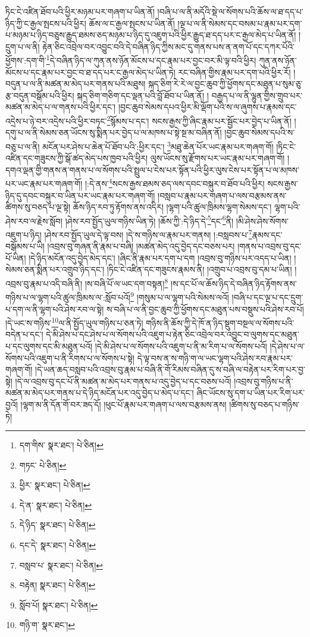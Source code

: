 ཏིང་ངེ་འཛིན་ཐོབ་པའི་ཕྱིར་མཉམ་པར་གཞག་པ་ཡིན་ནོ། །བཞི་པ་ལ་ནི་མདོའི་སྡེ་ལ་སོགས་པའི་ཆོས་ལ་ཐ་དད་པ་ཉིད་ཀྱི་ང་རྒྱལ་སྤངས་པའི་ཕྱིར། ཆོས་ལ་ང་རྒྱལ་སྤངས་པ་ཡིན་ནོ། །ལྔ་པ་ལ་ནི་སེམས་དང་བསམ་པ་རྣམ་པར་དག་པ་མཉམ་པ་ཉིད་བཅུས་རྒྱུད་ཐམས་ཅད་མཉམ་པ་ཉིད་དུ་འཇུག་པའི་ཕྱིར་རྒྱུད་ཐ་དད་པར་ང་རྒྱལ་མེད་པ་ཡིན་ནོ། །དྲུག་པ་ལ་ནི། རྟེན་ཅིང་འབྲེལ་བར་འབྱུང་བའི་དེ་བཞིན་ཉིད་ཀྱིས་མང་དུ་གནས་པས་ན་ནག་པོ་དང་དཀར་པོའི་ཕྱོགས་:དག་གི་\footnote{དག་གིས་  སྣར་ཐང་།  པེ་ཅིན། }དེ་བཞིན་ཉིད་ལ་ཀུན་ནས་ཉོན་མོངས་པ་དང་རྣམ་པར་བྱང་བར་མི་ལྟ་བའི་ཕྱིར། ཀུན་ནས་ཉོན་མོངས་པ་དང་རྣམ་པར་བྱང་བ་ཐ་དད་པར་ང་རྒྱལ་མེད་པ་ཡིན་ཏེ། རང་བཞིན་གྱིས་རྣམ་པར་དག་པའི་ཕྱིར་རོ། །བདུན་པ་ལ་ནི་མཚན་མ་མེད་པར་གནས་པའི་མཐུས། སྐད་ཅིག་རེ་རེ་ལ་བྱང་ཆུབ་ཀྱི་ཕྱོགས་དང་མཐུན་པ་སུམ་ཅུ་རྩ་བདུན་བསྒོམ་པའི་ཕྱིར། སྐད་ཅིག་གཅིག་དང་ལྡན་པའི་བློ་ཐོབ་པ་ཡིན་ནོ། །
བརྒྱད་པ་ལ་ནི་ལྷུན་གྱིས་གྲུབ་པར་མཚན་མ་མེད་པ་ལ་གནས་པའི་ཕྱིར་དང་། །བྱང་ཆུབ་སེམས་དཔའ་ཕྱིར་མི་ལྡོག་པའི་ས་ལ་ཞུགས་པ་རྣམས་དང་འདྲེས་པ་ཉེ་བར་འདྲེས་པའི་ཕྱིར་བཏང་\footnote{གཏང་  པེ་ཅིན། }སྙོམས་པ་དང་། སངས་རྒྱས་ཀྱི་ཞིང་རྣམ་པར་སྦྱོང་པར་བྱེད་པ་ཡིན་ནོ། །དགུ་པ་ལ་ནི་སེམས་ཅན་ཡོངས་སུ་སྨིན་པར་བྱེད་པ་ལ་མཁས་པ་སྟེ་སྔ་མ་བཞིན་ནོ། །བྱང་ཆུབ་སེམས་དཔའི་ས་བཅུ་པ་ལ་ནི། མངོན་པར་ཤེས་པ་ཆེན་པོ་ཐོབ་པའི་:ཕྱིར་དང་། \footnote{ཕྱིར་  སྣར་ཐང་།  པེ་ཅིན། }མཐུ་ཆེན་པོར་ཡང་རྣམ་པར་གཞག་གོ། །ཏིང་ངེ་འཛིན་དང་གཟུངས་ཀྱི་སྒོ་ཚད་མེད་པས་ཁྱབ་པའི་ཕྱིར། ལུས་ཡོངས་སུ་རྫོགས་པར་ཡང་རྣམ་པར་གཞག་གོ། །དགའ་ལྡན་གྱི་གནས་ན་གནས་པ་ལ་སོགས་པའི་སྤྲུལ་པ་ངེས་པར་སྟོན་པའི་ཕྱིར་ལུས་ངེས་པར་སྟོན་པ་ལ་མཁས་པར་ཡང་རྣམ་པར་གཞག་གོ། །:དེ་ནས་\footnote{དེ་ན་  སྣར་ཐང་།  པེ་ཅིན། }སངས་རྒྱས་ཐམས་ཅད་ལས་དབང་བསྐུར་བ་ཐོབ་པའི་ཕྱིར། སངས་རྒྱས་ཉིད་དུ་དབང་བསྐུར་བ་ཡིན་པར་ཡང་རྣམ་པར་གཞག་གོ། །བསླབ་པ་རྣམ་པར་གཞག་པ་ལས་བརྩམས་ནས་ཚིགས་སུ་བཅད་པ་ལྔ་སྟེ། ཆོས་ཉིད་རབ་ཏུ་རྟོགས་ནས་འདིར། །ལྷག་པའི་ཚུལ་ཁྲིམས་ལྷག་སེམས་དང་། ལྷག་པའི་ཤེས་རབ་ལ་རྗེས་སློབ། །ཤེས་རབ་སྤྱོད་ཡུལ་གཉིས་ཡིན་ཏེ། །ཆོས་ཀྱི་:དེ་ཉིད་དེ་\footnote{དེ་ཉིད་  སྣར་ཐང་།  པེ་ཅིན། }དང་\footnote{དང་དེ་  སྣར་ཐང་།  པེ་ཅིན། }ནི། །མི་ཤེས་ཤེས་སོགས་འཇུག་པ་ཉིད། །ཤེས་རབ་སྤྱོད་ཡུལ་དེ་ལྟ་བས། །དེ་ས་གཉིས་ལ་རྣམ་པར་གནས། །:བསླབས་པ་\footnote{བསླབ་པ་  སྣར་ཐང་།  པེ་ཅིན། }རྣམས་དང་བསྒོམས་པ་ཡི། །འབྲས་བུ་གཞན་ནི་རྣམ་པ་བཞི། །མཚན་མེད་འདུ་བྱེད་དང་བཅས་པར། །གནས་པ་འབྲས་བུ་དང་པོ་ཡིན། །དེ་ཉིད་མངོན་འདུ་བྱེད་མེད་དང་། །ཞིང་ནི་རྣམ་པར་དག་པ་དག །འབྲས་བུ་གཉིས་པར་འདད་པ་ཡིན། །སེམས་ཅན་སྨིན་པར་འགྲུབ་ཉིད་དང་། །ཏིང་ངེ་འཛིན་དང་གཟུངས་རྣམས་ནི། །འགྲུབ་པ་འབྲས་བུ་དམ་པ་ཡིན། །འབྲས་བུ་རྣམ་པ་འདི་བཞི་ནི། །ས་བཞི་པོ་ལ་ཡང་དག་བསྟན།\footnote{བརྟེན།  སྣར་ཐང་།  པེ་ཅིན། } །ས་དང་པོ་ལ་ཆོས་ཉིད་དེ་བཞིན་ཉིད་རྟོགས་ནས་གཉིས་པ་ལ་ལྷག་པའི་ཚུལ་ཁྲིམས་ལ་:སློབ་པའོ།\footnote{སློབ་པོ།  སྣར་ཐང་།  པེ་ཅིན། } །གསུམ་པ་ལ་ལྷག་པའི་སེམས་ལའོ། །བཞི་པ་དང་ལྔ་པ་དང་དྲུག་པ་དག་ལ་ནི་ལྷག་པའི་ཤེས་རབ་ལ་སྟེ། ས་བཞི་པ་ལ་ནི་བྱང་ཆུབ་ཀྱི་ཕྱོགས་དང་མཐུན་པས་བསྡུས་པའི་ཤེས་རབ་པོ། །དེ་ཡང་ས་གཉིས་\footnote{གཉི་ག་  སྣར་ཐང་། }ལ་ནི་སྤྱོད་ཡུལ་གཉིས་པ་ཅན་ཏེ། གཉིས་ནི་ཆོས་ཀྱི་དེ་ཁོ་ན་ཉིད་སྡུག་བསྔལ་ལ་སོགས་པའི་བདེན་པ་དང་། དེ་མི་ཤེས་པ་དང་ཤེས་པ་ལ་སོགས་པའི་འཇུག་པ་རྟེན་ཅིང་འབྲེལ་བར་འབྱུང་བ་ལུགས་དང་མཐུན་པ་དང་ལུགས་དང་མི་མཐུན་པའོ། །དེ་མི་ཤེས་པ་ལ་སོགས་པའི་འཇུག་པ་ནི་མ་རིག་པ་ལ་སོགས་པའོ། །དེ་ཤེས་པ་ལ་སོགས་པའི་འཇུག་པ་ནི་རིགས་པ་ལ་སོགས་པ་སྟེ། དེ་ལྟ་བས་ན་ས་གཉི་ག་ལ་ཡང་ལྷག་པའི་ཤེས་རབ་རྣམ་པར་གཞག་གོ། །དེ་ཡན་ཆད་བསླབ་པའི་འབྲས་བུ་རྣམ་པ་བཞི་ནི་གོ་རིམས་བཞིན་དུ་ས་བཞི་ལ་བརྟེན་པར་རིག་པར་བྱ་སྟེ། །དེ་ལ་འབྲས་བུ་དང་པོ་ནི་མཚན་མ་མེད་པར་གནས་པ་འདུ་བྱེད་པ་དང་བཅས་པའོ། །འབྲས་བུ་གཉིས་པ་ནི་མཚན་མ་མེད་པར་གནས་པ་དེ་ཉིད་མངོན་པར་འདུ་བྱེད་པ་མེད་པ་དང་། ཞིང་ཡོངས་སུ་དག་པ་ཡིན་པར་རིག་པར་བྱའོ། །ལྷག་མ་ནི་དོན་གོ་བར་ཟད་དོ། །ཕུང་པོ་རྣམ་པར་གཞག་པ་ལས་བརྩམས་ནས། །ཚིགས་སུ་བཅད་པ་གཉིས་ཏེ། 